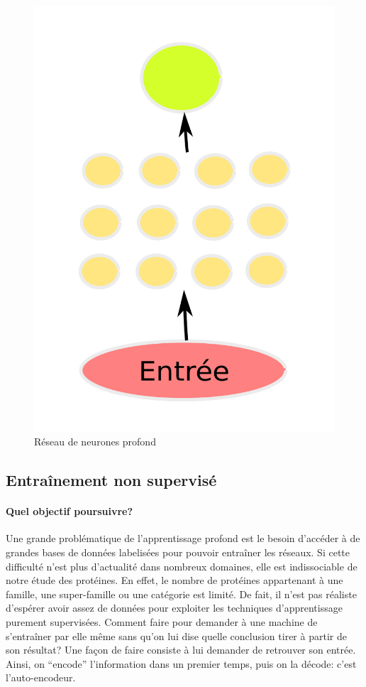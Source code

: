 \documentclass[a4paper, 11pt, onecolumn]{article}
\begin{document}
\begin{figure}[!tbp]
\begin{minipage}[b]{0.3\textwidth}
    \includegraphics[width=\textwidth]{Deep}
    \caption{Réseau de neurones profond}
  \end{minipage}
\end{figure}


\subsection{Entraînement non supervisé}

\paragraph{Quel objectif poursuivre?}

Une grande problématique de l'apprentissage profond est le besoin d'accéder à de
grandes bases de données labelisées pour pouvoir entraîner les réseaux. Si cette difficulté
n'est plus d'actualité dans nombreux domaines, elle est indissociable de notre
étude des protéines. En effet, le nombre de protéines appartenant à une famille,
une super-famille ou une catégorie est limité. De fait, il n'est pas réaliste
d'espérer avoir assez de données pour exploiter les techniques d'apprentissage
purement supervisées. Comment faire pour demander à une machine de s'entraîner par elle même sans
qu'on lui dise quelle conclusion tirer à partir de son résultat? Une façon de
faire consiste à lui demander de retrouver son entrée. Ainsi, on ``encode''
l'information dans un premier temps, puis on la \og décode\fg : c'est l'auto-encodeur.
\end{document}
